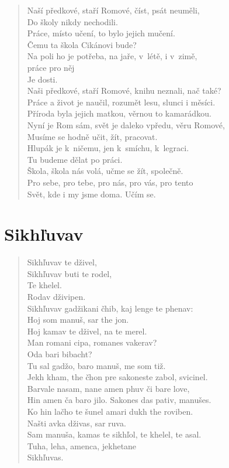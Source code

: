 \begin{verse}
Naší předkové, staří Romové, číst, psát neuměli, \\
Do školy nikdy nechodili. \\
Práce, místo učení, to bylo jejich mučení. \\
Čemu ta škola Cikánovi bude? \\
Na poli ho je potřeba, na jaře, v létě, i v zimě,  \\
\hspace{\fill}práce pro něj \\ 
Je dosti. \\
Naši předkové, staří Romové, knihu neznali, nač také? \\
Práce a život  je naučil, rozumět lesu, slunci i měsíci. \\
Příroda byla jejich matkou, věrnou to kamarádkou. \\
Nyní je Rom sám, svět je daleko vpředu, věru Romové, \\ 
Musíme se hodně učit, žít, pracovat. \\
Hlupák je k ničemu, jen k smíchu, k legraci. \\
Tu budeme dělat po práci. \\
Škola, škola nás volá, učme se žít, společně. \\
Pro sebe, pro tebe, pro nás, pro vás, pro tento \\
Svět, kde i my jsme doma. Učím se.
\end{verse}


\section{Sikhľuvav}

\begin{verse}
Sikhľuvav te dživel, \\
Sikhľuvav buti te rodel,\\
Te khelel.\\
Rodav dživipen. \\
Sikhľuvav gadžikani čhib, kaj lenge te phenav: \\
Hoj som manuš, sar the jon. \\
Hoj kamav te dživel, na te merel. \\
Man romani cipa, romanes vakerav? \\
Oda bari bibacht? \\
Tu sal gadžo, baro manuš, me som tiž. \\
Jekh kham, the čhon pre sakoneste zabol, svicinel. \\
Barvale nasam, nane amen phuv či bare love, \\
Hin amen ča baro jilo. Sakones das pativ, manušes. \\
Ko hin lačho te šunel amari dukh the roviben. \\
 Našti avka dživas, sar ruva. \\
Sam manuša, kamas te sikhľol, te khelel, te asal. \\
Tuha, leha, amenca, jekhetane \\
Sikhľuvas.
\end{verse}


